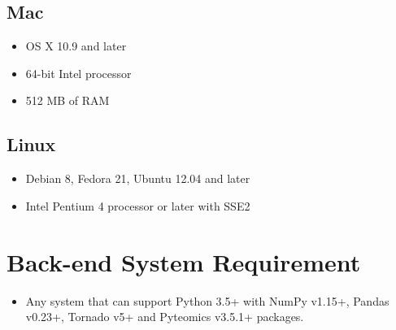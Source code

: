 \documentclass[../manual.tex]{subfiles}
\begin{document}
\subsection{Mac}
\begin{itemize}
	\item OS X 10.9 and later
	\item 64-bit Intel processor
	\item 512 MB of RAM
\end{itemize}
\subsection{Linux}
\begin{itemize}
	\item Debian 8, Fedora 21, Ubuntu 12.04 and later
	\item Intel Pentium 4 processor or later with SSE2
\end{itemize}
\section{Back-end System Requirement}
\begin{itemize}
	\item Any system that can support Python 3.5+ with NumPy v1.15+, Pandas v0.23+, Tornado v5+ and Pyteomics v3.5.1+ packages.
\end{itemize}
\end{document}
